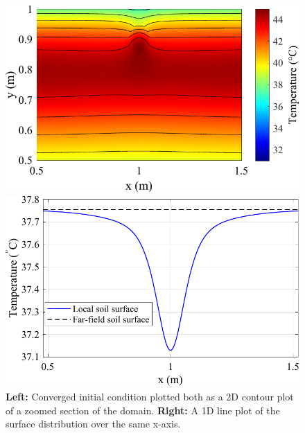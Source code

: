         \begin{figure}[htbp]
            \centering
            \begin{minipage}[b]{0.48\textwidth} %
                \includegraphics[width=\textwidth]{figs/Rory/A_temp_distribution.pdf}
            \end{minipage}
            \hfill %
            \begin{minipage}[b]{0.48\textwidth} %
                \includegraphics[width=\textwidth]{figs/Rory/1D_distribution_cropped.pdf}
            \end{minipage}
            \caption[Converged initial condition]{\textbf{Left:} Converged initial condition plotted both as a 2D contour plot of a zoomed section of the domain. \textbf{Right:} A 1D line plot of the surface distribution over the same x-axis.}
            \label{fig:combined_thermal}
        \end{figure}

